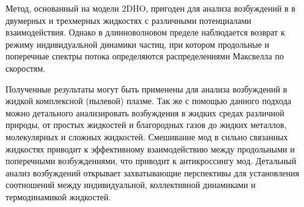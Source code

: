 Метод, основанный на модели 2DHO, пригоден для анализа возбуждений в
 в двумерных и трехмерных жидкостях с различными потенциалами взаимодействия. Однако в длинноволновом пределе наблюдается возврат к режиму индивидуальной динамики частиц, при котором
продольные и поперечные спектры потока определяются распределениями Максвелла по скоростям.

Полученные результаты могут быть применены для анализа возбуждений в жидкой комплексной (пылевой) плазме.
Так же с помощью данного подхода можно детального анализировать возбуждения в жидких средах различной природы, от
простых жидкостей и благородных газов до жидких металлов, молекулярных и сложных жидкостей. Смешивание мод в сильно связанных жидкостях приводит к эффективному взаимодействию между продольными и поперечными возбуждениями, что приводит к антикроссингу мод. Детальный анализ возбуждений открывает захватывающие перспективы для установления  соотношений между индивидуальной, коллективной динамиками и
термодинамикой жидкостей. 
